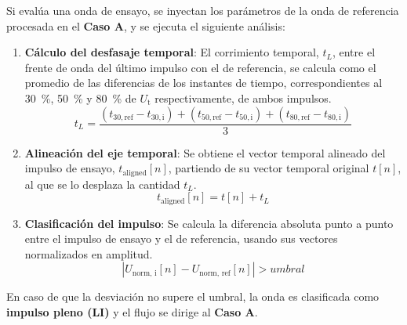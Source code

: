 Si evalúa una onda de ensayo, se inyectan los parámetros de la onda de referencia procesada en el \textbf{Caso A}, y se ejecuta el siguiente análisis:
\begin{enumerate}[resume]
    \item \textbf{Cálculo del desfasaje temporal}: El corrimiento temporal, $t_L$, entre el frente de onda del último impulso con el de referencia, se calcula como el promedio de las diferencias de los instantes de tiempo, correspondientes al \qty{30}{\percent}, \qty{50}{\percent} y \qty{80}{\percent} de $U_\text{t}$ respectivamente, de ambos impulsos.
    \begin{equation}
        t_L = \frac{\left( t_{30, \text{ref}} - t_{30, \text{i}} \right) + \left( t_{50, \text{ref}} - t_{50, \text{i}} \right) + \left( t_{80, \text{ref}} - t_{80, \text{i}} \right)}{3} 
    \end{equation}
    \item \textbf{Alineación del eje temporal}: Se obtiene el vector temporal alineado del impulso de ensayo, $t_\text{aligned}[n]$, partiendo de su vector temporal original $t[n]$, al que se lo desplaza la cantidad $t_L$.
    \begin{equation}
        \label{eq:eje_alineado}
        t_\text{aligned}[n] = t[n] + t_L
    \end{equation}
    \item \textbf{Clasificación del impulso}: Se calcula la diferencia absoluta punto a punto entre el impulso de ensayo y el de referencia, usando sus vectores normalizados en amplitud.
    \begin{equation}
        \label{eq:umbral_desviacion}
        | U_{\text{norm, i}}[n] - U_{\text{norm, ref}}[n] | > umbral
    \end{equation}
\end{enumerate}

En caso de que la desviación no supere el umbral, la onda es clasificada como \textbf{impulso pleno (LI)} y el flujo se dirige al \textbf{Caso A}.

